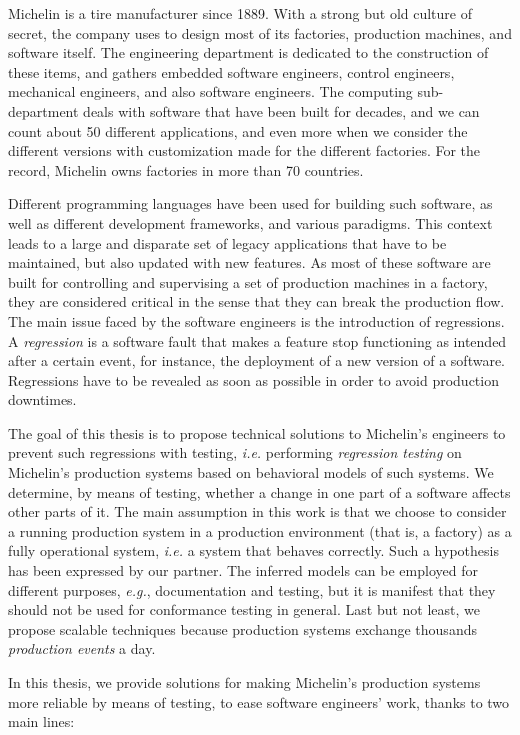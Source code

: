 Michelin is a tire manufacturer since 1889. With a strong but old
culture of secret, the company uses to design most of its
factories, production machines, and software itself. The
engineering department is dedicated to the construction of these
items, and gathers embedded software engineers, control
engineers, mechanical engineers, and also software engineers. The
computing sub-department deals with software that have been built
for decades, and we can count about 50 different applications,
and even more when we consider the different versions with
customization made for the different factories. For the record,
Michelin owns factories in more than 70 countries.

Different programming languages have been used for building such
software, as well as different development frameworks, and
various paradigms. This context leads to a large and disparate
set of legacy applications that have to be maintained, but also
updated with new features. As most of these software are built
for controlling and supervising a set of production machines in a
factory, they are considered critical in the sense that they can
break the production flow. The main issue faced by the software
engineers is the introduction of regressions. A \emph{regression}
is a software fault that makes a feature stop functioning as
intended after a certain event, for instance, the deployment of a
new version of a software. Regressions have to be revealed as
soon as possible in order to avoid production downtimes.

The goal of this thesis is to propose technical solutions to
Michelin's engineers to prevent such regressions with testing,
\emph{i.e.} performing \emph{regression testing} on Michelin's
production systems based on behavioral models of such systems.
We determine, by means of testing, whether a change in
one part of a software affects other parts of it. The main
assumption in this work is that we choose to consider a running
production system in a production environment (that is, a
factory) as a fully operational system, \emph{i.e.} a system that
behaves correctly.  Such a hypothesis has been expressed by our
partner. The inferred models can be employed for different
purposes, \emph{e.g.}, documentation and testing, but it is
manifest that they should not be used for conformance testing in
general. Last but not least, we propose scalable techniques
because production systems exchange thousands \emph{production
events} a day.

In this thesis, we provide solutions for making Michelin's
production systems more reliable by means of testing, to ease
software engineers' work, thanks to two main lines:

